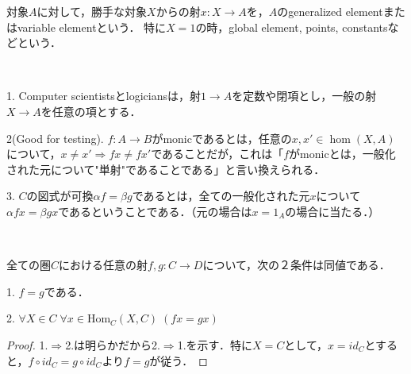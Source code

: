 \documentclass[uplatex, 12pt, dvipdfmx]{jsarticle}
\begin{document}
\begin{definition*}
    対象$A$に対して，勝手な対象$X$からの射$x:X\to A$を，$A$のgeneralized elementまたはvariable elementという．
    特に$X=1$の時，global element, points, constantsなどという．
\end{definition*}
\vspace{1cm}
\begin{remark*}　

    1. Computer scientistsとlogiciansは，射$1\to A$を定数や閉項とし，一般の射$X\to A$を任意の項とする．
\vspace{1cm}

    2(Good for testing). $f:A\to B$がmonicであるとは，任意の$x,x'\in\hom(X,A)$について，$x\ne x'\Rightarrow fx\ne fx'$であることだが，これは「$f$がmonicとは，一般化された元について"単射"であることである」と言い換えられる．
    \vspace{1cm}

    3. $C$の図式が可換$\alpha f=\beta g$であるとは，全ての一般化された元$x$について$\alpha fx=\beta gx$であるということである．（元の場合は$x=1_A$の場合に当たる．）
    \vspace{1cm}
\end{remark*}
\begin{proposition*}[射の相等の特徴付け]　
    
    全ての圏$C$における任意の射$f,g:C\to D$について，次の２条件は同値である．
    
    1. $f=g$である．

    2. $\forall X\in C\; \forall x\in\mathrm{Hom}_C(X,C)\; (fx=gx)$
\end{proposition*}
\begin{proof}
    1.$\Rightarrow$2.は明らかだから2.$\Rightarrow$1.を示す．特に$X=C$として，$x=id_C$とすると，$f\circ id_C=g\circ id_C$より$f=g$が従う．
\end{proof}
\vspace{3cm}
\end{document}
